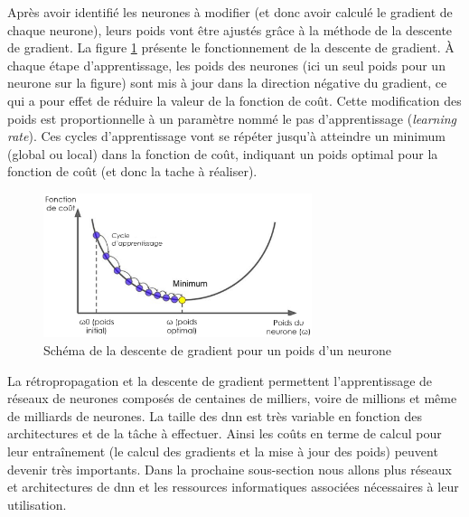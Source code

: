 Après avoir identifié les neurones à modifier (et donc avoir calculé le gradient de chaque neurone), leurs poids vont être ajustés grâce à la méthode de la descente de gradient. La figure \ref{fig:grad_descent} présente le fonctionnement de la descente de gradient. À chaque étape d'apprentissage, les poids des neurones (ici un seul poids pour un neurone sur la figure) sont mis à jour dans la direction négative du gradient, ce qui a pour effet de réduire la valeur de la fonction de coût. Cette modification des poids  est proportionnelle à un paramètre nommé le pas d'apprentissage (\textit{learning rate}). Ces cycles d'apprentissage vont se répéter jusqu'à atteindre un minimum (global ou local) dans la fonction de coût, indiquant un poids optimal pour la fonction de coût (et donc la tache à réaliser).
\begin{figure}[!ht]
 \centering
 \includegraphics[width=0.7\textwidth]{figures/gradient_descent.png}
 \caption[Schéma de la descente de gradient pour un poids d'un neuronne]{Schéma de la descente de gradient pour un poids d'un neurone}
 \label{fig:grad_descent}
\end{figure}


La rétropropagation et la descente de gradient permettent l'apprentissage de réseaux de neurones composés de centaines de milliers, voire de millions et même de milliards de neurones. La taille des \gls{dnn} est très variable en fonction des architectures et de la tâche à effectuer. Ainsi les coûts en terme de calcul pour leur entraînement (le calcul des gradients et la mise à jour des poids) peuvent devenir très importants. Dans la prochaine sous-section nous allons plus réseaux et architectures de \gls{dnn} et les ressources informatiques associées nécessaires à leur utilisation.

